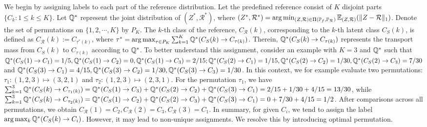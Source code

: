 We begin by assigning labels to each part of the reference distribution. Let the predefined reference consist of $K$ disjoint parts $\{C_k: 1\leq k \leq K\}$. Let $\mathbb{Q}^*$ represent the joint distribution of $(Z^*, \mathcal{R}^*)$, where $(Z^*, \mathcal{R}^*)= \arg\min_{(Z, \mathcal{R}) \in \Pi(\mathbb{P}_f, \mathbb{P}_\mathcal{R})}\mathbb{E}_{(Z, \mathcal{R})}(\Vert{Z - \mathcal{R}}\Vert_1)$.  Denote the set of permutations on $\{1, 2,\cdots, K\}$ by $P_K$. The $k$-th class of the reference, $C_\mathcal{R}(k)$, corresponding to the $k$-th latent class $C_S(k)$, is defined as $C_\mathcal{R}(k) := C_{\tau^*(k)}$, where $\tau^* = \operatorname*{arg\,max}_{\tau \in P_K}\sum_{k=1}^K\mathbb{Q}^*(C_S(k) \to C_{\tau(k)})$. Therein, $\mathbb{Q}^*(C_S(k) \to C_{\tau(k)})$ represents the transport mass from $C_S(k)$ to $C_{\tau(k)}$ according to $\mathbb{Q}^*$. To better understand this assignment, consider an example with $K = 3$ and $\mathbb{Q}^*$ such that $\mathbb{Q}^*(C_S(1) \to C_1) = 1/5,\mathbb{Q}^*(C_S(1) \to C_2) = 0,  \mathbb{Q}^*(C_S(1) \to C_3) = 2/15; \mathbb{Q}^*(C_S(2) \to C_1) = 1/15, \mathbb{Q}^*(C_S(2) \to C_2) = 1/30, \mathbb{Q}^*(C_S(2) \to C_3) = 7/30$ and $\mathbb{Q}^*(C_S(3) \to C_1) = 4/15,  \mathbb{Q}^*(C_S(3) \to C_2) = 1/30, \mathbb{Q}^*(C_S(3) \to C_3) = 1/30$. In this context, we for example evaluate two permutations: $\tau_1: (1, 2, 3) \mapsto (3, 2, 1)$ and $\tau_2: (1, 2, 3) \mapsto (2, 3, 1)$. For the permutation $\tau_1$, we have $\sum_{k=1}^3\mathbb{Q}^*(C_S(k) \to C_{\tau_1(k)}) = \mathbb{Q}^*(C_S(1) \to C_3) + \mathbb{Q}^*(C_S(2) \to C_2) + \mathbb{Q}^*(C_S(3) \to C_1) = 2/15 + 1/30 + 4/15 = 13 / 30$, while $\sum_{k=1}^3\mathbb{Q}^*(C_S(k) \to C_{\tau_2(k)}) = \mathbb{Q}^*(C_S(1) \to C_2) + \mathbb{Q}^*(C_S(2) \to C_3) + \mathbb{Q}^*(C_S(3) \to C_1) = 0 + 7/30 + 4/15 = 1/2$. After comparisons across all permutations, we obtain $C_\mathcal{R}(1) = C_2, C_\mathcal{R}(2) = C_3, C_\mathcal{R}(3) = C_1$. In summary, for given $C_i$, we tend to assign the label $\arg\max_k \mathbb{Q}^*(C_S(k) \to C_i)$. However, it may lead to non-unique assignments. We resolve this by introducing optimal permutation.

